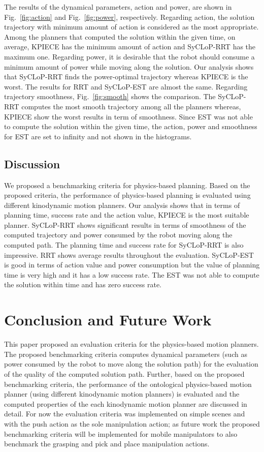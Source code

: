 \documentclass[runningheads,a4paper]{llncs}
\begin{document}
The results of the dynamical parameters, action and power, are shown in Fig.~\ref{fig:action} and Fig.~\ref{fig:power}, respectively. 
Regarding action, the solution trajectory
with minimum amount of action is considered as the most appropriate. Among the planners that computed the solution within the given time, on average, KPIECE
has the minimum amount of action and SyCLoP-RRT has the maximum one. 
Regarding power, it is desirable that the robot should consume a minimum amount of power while moving along the
solution. Our analysis shows that SyCLoP-RRT finds the power-optimal trajectory whereas KPIECE is the worst. The results for
RRT and SyCLoP-EST are almost the same.  
Regarding trajectory smoothness, Fig.~\ref{fig:smooth} shows the comparison. The SyCLoP-RRT computes the most smooth trajectory among all the planners
whereas, KPIECE show the worst results in term of smoothness. Since EST was not able to compute the solution within the given time, the action, power and smoothness
for EST are set to infinity and not shown in the histograms.

\subsection{Discussion}
We proposed a benchmarking criteria for physics-based planning. Based on the proposed criteria, the performance of physics-based planning is evaluated using
different kinodynamic motion planners. Our analysis shows that in terms of planning time, success rate and the action value, KPIECE is the most suitable planner. SyCLoP-RRT
shows significant results in terms of smoothness of the computed trajectory and power consumed by the robot moving along the computed path. The planning
time and success rate for SyCLoP-RRT is also impressive. RRT shows average results throughout the evaluation. SyCLoP-EST is good in terms of action value and power
consumption but the value of planning time is very high and it has a low success rate. The EST was not able to compute the solution within time and has zero success rate.

\section{Conclusion and Future Work}
This paper proposed an evaluation criteria for the physics-based motion planners. The proposed benchmarking criteria computes  dynamical parameters
(such as power consumed by the robot to move along the solution path) for the evaluation of the quality of the computed solution path.
Further, based on the proposed benchmarking criteria, the performance of the ontological physics-based motion planner (using different kinodynamic motion
planners) is evaluated and the computed properties of the each kinodynamic motion planner are discussed in detail. For now the evaluation criteria
was implemented on simple scenes and with the push action as the sole manipulation action; as future work the proposed benchmarking criteria will be implemented for mobile manipulators to also benchmark the grasping
and pick and place manipulation actions.

\balance

\end{document}
